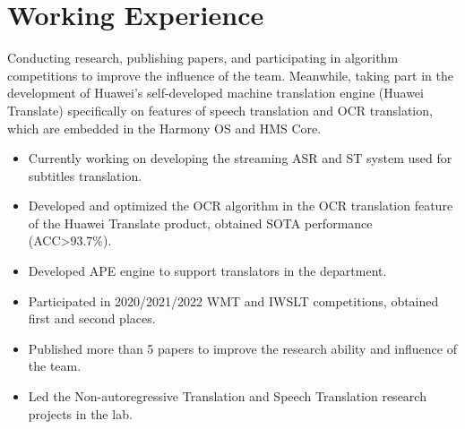 \documentclass{resume_en}
\begin{document}


 

\section{Working Experience}
Conducting research, publishing papers, and participating in algorithm competitions to improve the influence of the team. Meanwhile, taking part in the development of Huawei's self-developed machine translation engine (Huawei Translate) specifically on features of speech translation and OCR translation, which are embedded in the Harmony OS and HMS Core.
\begin{itemize}
  \item Currently working on developing the streaming ASR and ST system used for subtitles translation.
  \item Developed and optimized the OCR algorithm in the OCR translation feature of the Huawei Translate product, obtained SOTA performance (ACC>93.7\%).
  \item Developed APE engine to support translators in the department.
  \item Participated in 2020/2021/2022 WMT and IWSLT competitions, obtained first and second places.
  \item Published more than 5 papers to improve the research ability and influence of the team.
  \item Led the Non-autoregressive Translation and Speech Translation research projects in the lab.
\end{itemize}
\end{document}
